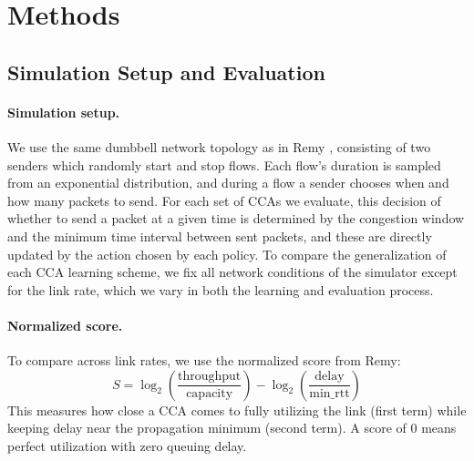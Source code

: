 \section{Methods}
\label{sec:methods}

\subsection{Simulation Setup and Evaluation}

\paragraph{Simulation setup.}
We use the same dumbbell network topology as in Remy \cite{winstein2013tcp}, consisting of two senders which randomly start and stop flows. Each flow's duration is sampled from an exponential distribution, and during a flow a sender chooses when and how many packets to send. For each set of CCAs we evaluate, this decision of whether to send a packet at a given time is determined by the congestion window and the minimum time interval between sent packets, and these are directly updated by the action chosen by each policy. To compare the generalization of each CCA learning scheme, we fix all network conditions of the simulator except for the link rate, which we vary in both the learning and evaluation process.

%

\paragraph{Normalized score.}
To compare across link rates, we use the normalized score from Remy:
\begin{equation}
S = \log_2\!\left(\frac{\text{throughput}}{\text{capacity}}\right) - \log_2\!\left(\frac{\text{delay}}{\text{min\_rtt}}\right)
\end{equation}
This measures how close a CCA comes to fully utilizing the link (first term) while keeping delay near the propagation minimum (second term). A score of $0$ means perfect utilization with zero queuing delay.

